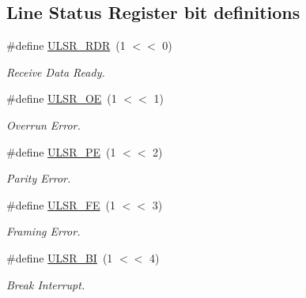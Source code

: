\subsection*{Line Status Register bit definitions}
\begin{DoxyCompactItemize}
\item 
\mbox{\label{group__rtl22xx__uart_ga69d6fbe8514ee7bd664ddf655116629f}} 
\#define \mbox{\hyperlink{group__rtl22xx__uart_ga69d6fbe8514ee7bd664ddf655116629f}{U\+L\+S\+R\+\_\+\+R\+DR}}~(1 $<$$<$ 0)
\begin{DoxyCompactList}\small\item\em Receive Data Ready. \end{DoxyCompactList}\item 
\mbox{\label{group__rtl22xx__uart_ga6dcc3cf820995cb4136ae54f1f1a274a}} 
\#define \mbox{\hyperlink{group__rtl22xx__uart_ga6dcc3cf820995cb4136ae54f1f1a274a}{U\+L\+S\+R\+\_\+\+OE}}~(1 $<$$<$ 1)
\begin{DoxyCompactList}\small\item\em Overrun Error. \end{DoxyCompactList}\item 
\mbox{\label{group__rtl22xx__uart_gada835e981ebab4556c07ea3b8ab0ee3f}} 
\#define \mbox{\hyperlink{group__rtl22xx__uart_gada835e981ebab4556c07ea3b8ab0ee3f}{U\+L\+S\+R\+\_\+\+PE}}~(1 $<$$<$ 2)
\begin{DoxyCompactList}\small\item\em Parity Error. \end{DoxyCompactList}\item 
\mbox{\label{group__rtl22xx__uart_gad13ee90e99a7efc843d50508910ae01a}} 
\#define \mbox{\hyperlink{group__rtl22xx__uart_gad13ee90e99a7efc843d50508910ae01a}{U\+L\+S\+R\+\_\+\+FE}}~(1 $<$$<$ 3)
\begin{DoxyCompactList}\small\item\em Framing Error. \end{DoxyCompactList}\item 
\mbox{\label{group__rtl22xx__uart_ga7aec434489da4290fe7015989557475e}} 
\#define \mbox{\hyperlink{group__rtl22xx__uart_ga7aec434489da4290fe7015989557475e}{U\+L\+S\+R\+\_\+\+BI}}~(1 $<$$<$ 4)
\begin{DoxyCompactList}\small\item\em Break Interrupt. \end{DoxyCompactList}\item 
$$
\end{DoxyCompactItemize}
